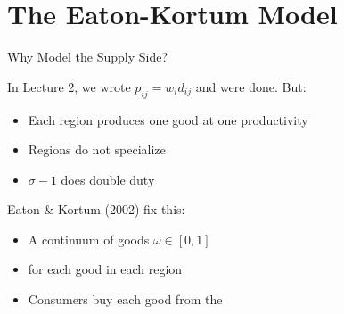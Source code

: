 \documentclass{beamer}
\begin{document}

\section{The Eaton-Kortum Model}

\begin{frame}{Why Model the Supply Side?}

    In Lecture 2, we wrote $p_{ij} = w_i d_{ij}$ and were done. But:

    \vspace{0.3em}
    \begin{itemize}
        \item {} Each region produces one good at one productivity
        \item {} Regions do not specialize
        \item {} $\sigma - 1$ does double duty
    \end{itemize}

    \vspace{0.3em}
    Eaton \& Kortum (2002) fix this:
    \begin{itemize}
        \item A continuum of goods $\omega \in [0,1]$
        \item {} for each good in each region
        \item Consumers buy each good from the 
    \end{itemize}

    \vspace{0.2em}

\end{frame}
\end{document}
